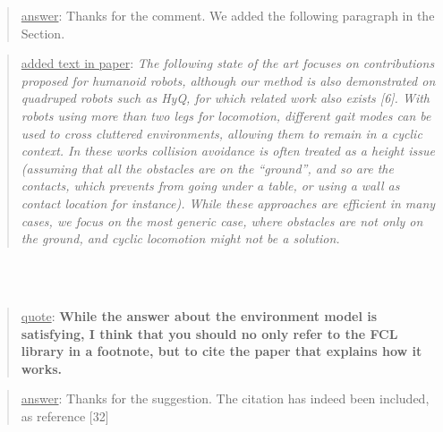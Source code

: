 \documentclass[a4paper]{article}
\newcommand\quot[1]{\begin{quote} \underline{quote}: \textbf{#1}\end{quote}}
\newcommand\as[1]{\begin{quote} \underline{answer}: {#1}\end{quote} }
\newcommand\qt[1]{\begin{quote} \underline{added text in paper}: \textit{#1}\end{quote} \leavevmode \\ }
\begin{document}
\as{Thanks for the comment. We added the following paragraph in the Section.}
\qt{The following state of the art focuses on contributions proposed for humanoid robots, although our method is also demonstrated on quadruped robots such as HyQ, for which related work also exists [6]. With robots using more than two legs for locomotion, different gait modes can be used to cross cluttered environments, allowing them to remain in a cyclic context. In these works collision avoidance is often treated as a height issue (assuming that all the obstacles are on the ``ground'', and so are the contacts, which prevents from going under a table, or using a wall as contact location for instance). While these approaches are efficient in many cases, we focus on the most generic case, where obstacles are not only on the ground, and cyclic locomotion might not be a solution.}
\leavevmode \\

\quot{
While the answer about the environment model is satisfying, I think
that you should no only refer to the FCL library in a footnote, but to
cite the paper that explains how it works.
}
\as{Thanks for the suggestion. The citation has indeed been included, as reference [32]}
\leavevmode \\
\end{document}
